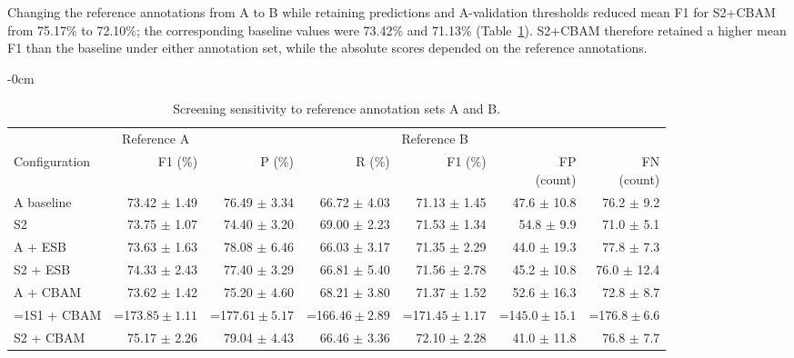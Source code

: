 \documentclass[energies,article,submit,pdftex,moreauthors]{Definitions/mdpi}
\providecommand{\revisionmode}{0}
\newcommand{\rev}[1]{\ifnum\revisionmode=1\relax{\color{red}#1}\else#1\fi}
\begin{document}
Changing the reference annotations from A to B while retaining predictions and A-validation thresholds reduced mean F1 for S2+CBAM from 75.17\% to 72.10\%; the corresponding baseline values were 73.42\% and 71.13\% (Table~\ref{tab:truth_prf}). S2+CBAM therefore retained a higher mean F1 than the baseline under either annotation set, while the absolute scores depended on the reference annotations.
\begin{table}[H]
\begin{adjustwidth}{-\extralength}{0cm}
\caption{Screening sensitivity to reference annotation sets A and B.}\label{tab:truth_prf}
\centering\small\setlength{\tabcolsep}{4.5pt}
\begin{adjustbox}{max width=\fulllength}
\begin{tabular}{lrrrrrr}
\toprule
 & \multicolumn{1}{c}{Reference A} & \multicolumn{5}{c}{Reference B} \\
\cmidrule(lr){2-2}\cmidrule(lr){3-7}
Configuration & F1 (\%) & P (\%) & R (\%) & F1 (\%) & \shortstack{FP\\(count)} & \shortstack{FN\\(count)} \\
\midrule
A baseline & 73.42 $\pm$ 1.49 & 76.49 $\pm$ 3.34 & 66.72 $\pm$ 4.03 & 71.13 $\pm$ 1.45 & 47.6 $\pm$ 10.8 & 76.2 $\pm$ 9.2 \\
S2 & 73.75 $\pm$ 1.07 & 74.40 $\pm$ 3.20 & 69.00 $\pm$ 2.23 & 71.53 $\pm$ 1.34 & 54.8 $\pm$ 9.9 & 71.0 $\pm$ 5.1 \\
A + ESB & 73.63 $\pm$ 1.63 & 78.08 $\pm$ 6.46 & 66.03 $\pm$ 3.17 & 71.35 $\pm$ 2.29 & 44.0 $\pm$ 19.3 & 77.8 $\pm$ 7.3 \\
S2 + ESB & 74.33 $\pm$ 2.43 & 77.40 $\pm$ 3.29 & 66.81 $\pm$ 5.40 & 71.56 $\pm$ 2.78 & 45.2 $\pm$ 10.8 & 76.0 $\pm$ 12.4 \\
A + CBAM & 73.62 $\pm$ 1.42 & 75.20 $\pm$ 4.60 & 68.21 $\pm$ 3.80 & 71.37 $\pm$ 1.52 & 52.6 $\pm$ 16.3 & 72.8 $\pm$ 8.7 \\
\rev{S1 + CBAM} & \rev{$73.85 \pm 1.11$} & \rev{$77.61 \pm 5.17$} & \rev{$66.46 \pm 2.89$} & \rev{$71.45 \pm 1.17$} & \rev{$45.0 \pm 15.1$} & \rev{$76.8 \pm 6.6$} \\
S2 + CBAM & 75.17 $\pm$ 2.26 & 79.04 $\pm$ 4.43 & 66.46 $\pm$ 3.36 & 72.10 $\pm$ 2.28 & 41.0 $\pm$ 11.8 & 76.8 $\pm$ 7.7 \\
\bottomrule\end{tabular}\end{adjustbox}
\par{}
\end{adjustwidth}
\end{table}
\end{document}
